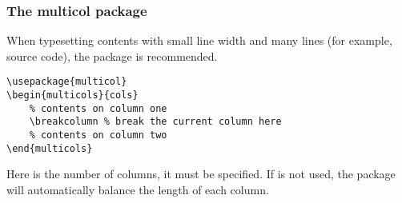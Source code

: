 \begin{frame}[fragile]
    \frametitle{The multicol package}
    When typesetting contents with small line width and many lines (for example, source code), the  package is recommended.
    \begin{command}
        \begin{verbatim}
\usepackage{multicol}
\begin{multicols}{cols}
    % contents on column one
    \breakcolumn % break the current column here
    % contents on column two
\end{multicols}
		\end{verbatim}
    \end{command}
    Here  is the number of columns, it must be specified. If \LC{\breakcolumn} is not used, the  package will automatically balance the length of each column.
\end{frame}
